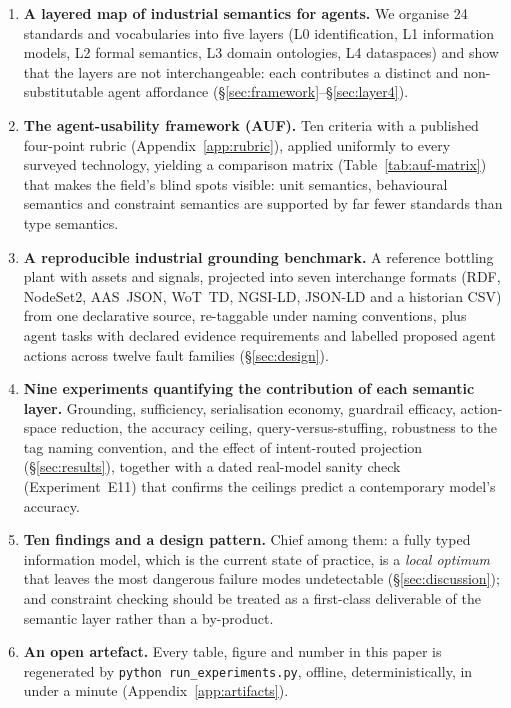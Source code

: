 \begin{enumerate}[label=\textbf{C\arabic*.},leftmargin=2.6em]
  \item \textbf{A layered map of industrial semantics for agents.} We organise
  24 standards and vocabularies into five layers
  (L0 identification, L1 information models, L2 formal semantics, L3 domain
  ontologies, L4 dataspaces) and show that the layers are not interchangeable:
  each contributes a distinct and non-substitutable agent affordance
  (\S\ref{sec:framework}--\S\ref{sec:layer4}).

  \item \textbf{The agent-usability framework (AUF).} Ten criteria with a
  published four-point rubric (Appendix~\ref{app:rubric}), applied uniformly to
  every surveyed technology, yielding a comparison matrix
  (Table~\ref{tab:auf-matrix}) that makes the field's blind spots visible: unit
  semantics, behavioural semantics and constraint semantics are supported by far
  fewer standards than type semantics.

  \item \textbf{A reproducible industrial grounding benchmark.} A reference
  bottling plant with \NAssets{} assets and \NSignals{} signals, projected into
  seven interchange formats (RDF, \opcua{} NodeSet2, AAS~JSON, WoT~TD, NGSI-LD,
  JSON-LD and a historian CSV) from one declarative source, re-taggable under
  \NSchemes{} naming conventions, plus \NTasks{} agent tasks with declared
  evidence requirements and \NCases{} labelled proposed agent actions across
  twelve fault families (\S\ref{sec:design}).

  \item \textbf{Nine experiments quantifying the contribution of each semantic layer.}
  Grounding, sufficiency, serialisation economy, guardrail efficacy,
  action-space reduction, the accuracy ceiling, query-versus-stuffing,
  robustness to the tag naming convention, and the effect of intent-routed
  projection (\S\ref{sec:results}), together with a dated real-model sanity check
  (Experiment~E11) that confirms the ceilings predict a contemporary model's
  accuracy.

  \item \textbf{Ten findings and a design pattern.} Chief among them: a fully
  typed information model, which is the current state of practice, is a
  \emph{local optimum} that leaves the most dangerous failure modes undetectable
  (\S\ref{sec:discussion}); and constraint checking should be treated as a
  first-class deliverable of the semantic layer rather than a by-product.

  \item \textbf{An open artefact.} Every table, figure and number in this paper
  is regenerated by \texttt{python run\_experiments.py}, offline, deterministically,
  in under a minute (Appendix~\ref{app:artifacts}).
\end{enumerate}

